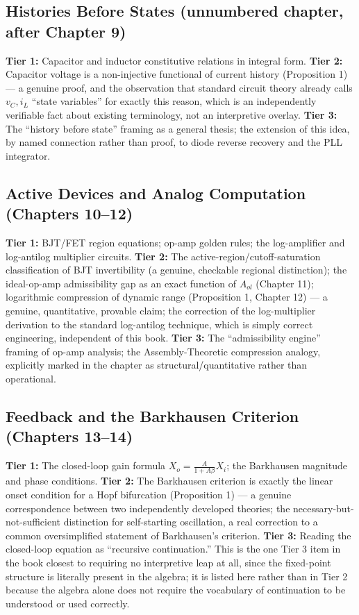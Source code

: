 \documentclass[12pt]{article}
\begin{document}
\subsection*{Histories Before States (unnumbered chapter, after Chapter 9)}
\textbf{Tier 1:} Capacitor and inductor constitutive relations in integral form.
\textbf{Tier 2:} Capacitor voltage is a non-injective functional of current history (Proposition 1) --- a genuine proof, and the observation that standard circuit theory already calls $v_C, i_L$ ``state variables'' for exactly this reason, which is an independently verifiable fact about existing terminology, not an interpretive overlay.
\textbf{Tier 3:} The ``history before state'' framing as a general thesis; the extension of this idea, by named connection rather than proof, to diode reverse recovery and the PLL integrator.

\subsection*{Active Devices and Analog Computation (Chapters 10--12)}
\textbf{Tier 1:} BJT/FET region equations; op-amp golden rules; the log-amplifier and log-antilog multiplier circuits.
\textbf{Tier 2:} The active-region/cutoff-saturation classification of BJT invertibility (a genuine, checkable regional distinction); the ideal-op-amp admissibility gap as an exact function of $A_{ol}$ (Chapter 11); logarithmic compression of dynamic range (Proposition 1, Chapter 12) --- a genuine, quantitative, provable claim; the correction of the log-multiplier derivation to the standard log-antilog technique, which is simply correct engineering, independent of this book.
\textbf{Tier 3:} The ``admissibility engine'' framing of op-amp analysis; the Assembly-Theoretic compression analogy, explicitly marked in the chapter as structural/quantitative rather than operational.

\subsection*{Feedback and the Barkhausen Criterion (Chapters 13--14)}
\textbf{Tier 1:} The closed-loop gain formula $X_o = \frac{A}{1+A\beta}X_i$; the Barkhausen magnitude and phase conditions.
\textbf{Tier 2:} The Barkhausen criterion is exactly the linear onset condition for a Hopf bifurcation (Proposition 1) --- a genuine correspondence between two independently developed theories; the necessary-but-not-sufficient distinction for self-starting oscillation, a real correction to a common oversimplified statement of Barkhausen's criterion.
\textbf{Tier 3:} Reading the closed-loop equation as ``recursive continuation.'' This is the one Tier 3 item in the book closest to requiring no interpretive leap at all, since the fixed-point structure is literally present in the algebra; it is listed here rather than in Tier 2 because the algebra alone does not require the vocabulary of continuation to be understood or used correctly.
\end{document}
